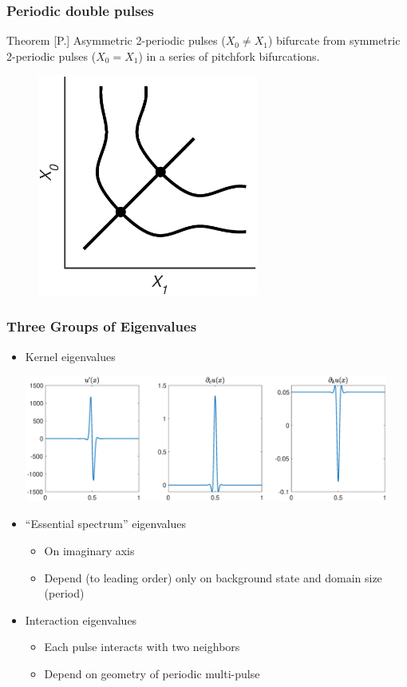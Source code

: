 \documentclass[16pt]{beamer}
\begin{document}
\begin{frame}
\frametitle{Periodic double pulses} 
    \begin{block}{Theorem [P.]}
    Asymmetric 2-periodic pulses ($X_0 \neq X_1$) bifurcate from symmetric 2-periodic pulses ($X_0 = X_1$) in a series of pitchfork bifurcations.

	\begin{figure}
	\begin{center}
	\includegraphics[width=7.25cm]{images/periodicpitchfork.eps}
	\end{center}
	\end{figure}
    \end{block}
\end{frame}

\begin{frame}
	\frametitle{Three Groups of Eigenvalues}
	\large

	\begin{itemize}
		\item Kernel eigenvalues 
		\begin{center}
			\includegraphics[width=12cm]{images/perkernel.eps}
			\end{center}
		\item ``Essential spectrum'' eigenvalues
		\begin{itemize}
			\item On imaginary axis
			\item Depend (to leading order) only on background state and domain size (period)
		\end{itemize}
		\item Interaction eigenvalues
		\begin{itemize}
			\item Each pulse interacts with two neighbors
			\item Depend on geometry of periodic multi-pulse
		\end{itemize}
	\end{itemize}
	\vspace{0.5cm}
\end{frame}
\end{document}
